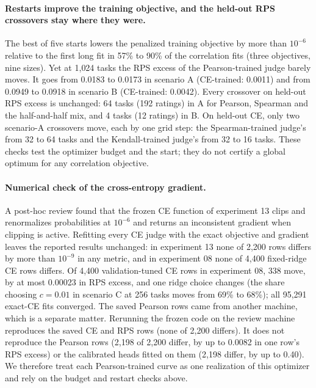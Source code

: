\paragraph{Restarts improve the training objective, and the held-out RPS crossovers stay where they were.}
The best of five starts lowers the penalized training objective by more than $10^{-6}$ relative to the first long fit in 57\% to 90\% of the correlation fits (three objectives, nine sizes).
Yet at 1{,}024 tasks the RPS excess of the Pearson-trained judge barely moves. It goes from 0.0183 to 0.0173 in scenario A (CE-trained: 0.0011) and from 0.0949 to 0.0918 in scenario B (CE-trained: 0.0042).
Every crossover on held-out RPS excess is unchanged: 64 tasks (192 ratings) in A for Pearson, Spearman and the half-and-half mix, and 4 tasks (12 ratings) in B.
On held-out CE, only two scenario-A crossovers move, each by one grid step: the Spearman-trained judge's from 32 to 64 tasks and the Kendall-trained judge's from 32 to 16 tasks.
These checks test the optimizer budget and the start; they do not certify a global optimum for any correlation objective.

\paragraph{Numerical check of the cross-entropy gradient.}
A post-hoc review found that the frozen CE function of experiment 13 clips and renormalizes probabilities at $10^{-6}$ and returns an inconsistent gradient when clipping is active.
Refitting every CE judge with the exact objective and gradient leaves the reported results unchanged: in experiment 13 none of 2{,}200 rows differs by more than $10^{-9}$ in any metric, and in experiment 08 none of 4{,}400 fixed-ridge CE rows differs.
Of 4{,}400 validation-tuned CE rows in experiment 08, 338 move, by at most 0.00023 in RPS excess, and one ridge choice changes (the share choosing $c=0.01$ in scenario C at 256 tasks moves from 69\% to 68\%); all 95{,}291 exact-CE fits converged.
The saved Pearson rows came from another machine, which is a separate matter.
Rerunning the frozen code on the review machine reproduces the saved CE and RPS rows (none of 2{,}200 differs).
It does not reproduce the Pearson rows (2{,}198 of 2{,}200 differ, by up to 0.0082 in one row's RPS excess) or the calibrated heads fitted on them (2{,}198 differ, by up to 0.40).
We therefore treat each Pearson-trained curve as one realization of this optimizer and rely on the budget and restart checks above.

